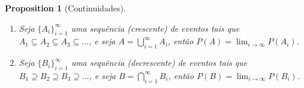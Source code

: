 \documentclass[
]{article}
\providecommand{\tightlist}{%
  \setlength{\itemsep}{0pt}\setlength{\parskip}{0pt}}
\newtheorem{proposition}{Proposition}[section]
\theoremstyle{definition}
\theoremstyle{definition}
\theoremstyle{definition}
\theoremstyle{definition}
\theoremstyle{remark}
\begin{document}
\begin{proposition}[Continuidades]
\protect\hypertarget{prp:continuidade}{}\label{prp:continuidade}\leavevmode

\begin{enumerate}
\def\labelenumi{\arabic{enumi}.}
\tightlist
\item
  Seja \(\{A_{i}\}_{i=1}^{\infty}\) uma sequência (crescente) de eventos tais que \(A_{1} \subseteq A_{2} \subseteq A_{3} \subseteq \dots\), e seja \(A = \bigcup_{i=1}^{\infty}A_{i}\), então \(P(A) = \lim_{i \to \infty}P(A_{i})\).
\item
  Seja \(\{B_{i}\}_{i=1}^{\infty}\) uma sequência (decrescente) de eventos tais que \(B_{1} \supseteq B_{2} \supseteq B_{3} \supseteq \dots\), e seja \(B = \bigcap_{i=1}^{\infty}B_{i}\), então \(P(B) = \lim_{i \to \infty}P(B_{i})\).
\end{enumerate}

\end{proposition}
\end{document}
